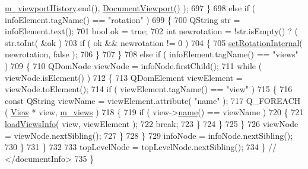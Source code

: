 \begin{DoxyCode}
      \hyperlink{classOkular_1_1DocumentPrivate_a47ead6a6650c01fb91ac512e55320f87}{m\_viewportHistory}.end(), \hyperlink{classOkular_1_1DocumentViewport}{DocumentViewport}() );
697                 \}
698                 \textcolor{keywordflow}{else} \textcolor{keywordflow}{if} ( infoElement.tagName() == \textcolor{stringliteral}{"rotation"} )
699                 \{
700                     QString str = infoElement.text();
701                     \textcolor{keywordtype}{bool} ok = \textcolor{keyword}{true};
702                     \textcolor{keywordtype}{int} newrotation = !str.isEmpty() ? ( str.toInt( &ok ) %
703                     \textcolor{keywordflow}{if} ( ok && newrotation != 0 )
704                     \{
705                         \hyperlink{classOkular_1_1DocumentPrivate_aceccc21fbf3022c439eb011a452a06fa}{setRotationInternal}( newrotation, \textcolor{keyword}{false} );
706                     \}
707                 \}
708                 \textcolor{keywordflow}{else} \textcolor{keywordflow}{if} ( infoElement.tagName() == \textcolor{stringliteral}{"views"} )
709                 \{
710                     QDomNode viewNode = infoNode.firstChild();
711                     \textcolor{keywordflow}{while} ( viewNode.isElement() )
712                     \{
713                         QDomElement viewElement = viewNode.toElement();
714                         \textcolor{keywordflow}{if} ( viewElement.tagName() == \textcolor{stringliteral}{"view"} )
715                         \{
716                             \textcolor{keyword}{const} QString viewName = viewElement.attribute( \textcolor{stringliteral}{"name"} );
717                             Q\_FOREACH ( \hyperlink{classOkular_1_1View}{View} * view, \hyperlink{classOkular_1_1DocumentPrivate_aae4139cb4cb2f63fd7c7c88f26199976}{m\_views} )
718                             \{
719                                 \textcolor{keywordflow}{if} ( view->\hyperlink{classOkular_1_1View_aac1d4ae8bad44a4a845de118892cfa1e}{name}() == viewName )
720                                 \{
721                                     \hyperlink{classOkular_1_1DocumentPrivate_a3cd7a844dbd51a7da80f93ea2aa9cf22}{loadViewsInfo}( view, viewElement );
722                                     \textcolor{keywordflow}{break};
723                                 \}
724                             \}
725                         \}
726                         viewNode = viewNode.nextSibling();
727                     \}
728                 \}
729                 infoNode = infoNode.nextSibling();
730             \}
731         \}
732 
733         topLevelNode = topLevelNode.nextSibling();
734     \} \textcolor{comment}{// </documentInfo>}
735 \}
\end{DoxyCode}

